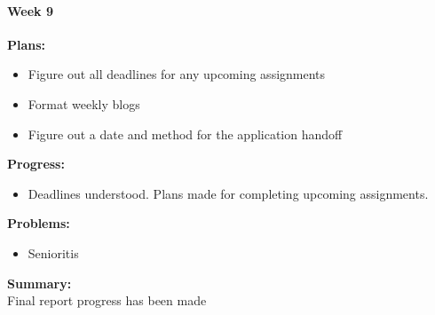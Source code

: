 \paragraph{Week 9}
\begin{adjustwidth}{2.5em}{0pt}
    \vspace{-0.5cm}\textbf{Plans:}
    \vspace{-0.5cm}
    \begin{itemize}
        \item Figure out all deadlines for any upcoming assignments
		\item Format weekly blogs
		\item Figure out a date and method for the application handoff
    \end{itemize} 
    \vspace{-0.3cm}\textbf{Progress:}
    \vspace{-0.5cm}
    \begin{itemize}
        \item Deadlines understood. Plans made for completing upcoming assignments. 

    \end{itemize} 
    \vspace{-0.3cm}\textbf{Problems:}
    \vspace{-0.5cm}
    \begin{itemize}
        \item Senioritis
    \end{itemize}  
    \vspace{-0.3cm}\noindent\textbf{Summary:}\\
    \noindent Final report progress has been made
\end{adjustwidth} 